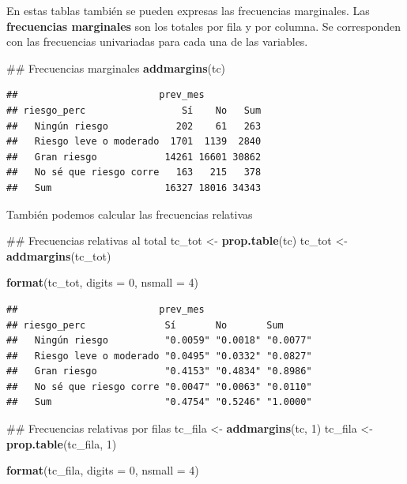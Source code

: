 \documentclass[spanish,]{book}
\newenvironment{Shaded}{\begin{snugshade}}{\end{snugshade}}
\newcommand{\KeywordTok}[1]{\textcolor[rgb]{0.13,0.29,0.53}{\textbf{#1}}}
\newcommand{\DataTypeTok}[1]{\textcolor[rgb]{0.13,0.29,0.53}{#1}}
\newcommand{\DecValTok}[1]{\textcolor[rgb]{0.00,0.00,0.81}{#1}}
\newcommand{\StringTok}[1]{\textcolor[rgb]{0.31,0.60,0.02}{#1}}
\newcommand{\NormalTok}[1]{#1}
\begin{document}
En estas tablas también se pueden expresas las frecuencias marginales.
Las \textbf{frecuencias marginales} son los totales por fila y por
columna. Se corresponden con las frecuencias univariadas para cada una
de las variables.

\begin{Shaded}
\begin{Highlighting}[]
\NormalTok{## Frecuencias marginales}
\KeywordTok{addmargins}\NormalTok{(tc)}
\end{Highlighting}
\end{Shaded}

\begin{verbatim}
##                         prev_mes
## riesgo_perc                 Sí    No   Sum
##   Ningún riesgo            202    61   263
##   Riesgo leve o moderado  1701  1139  2840
##   Gran riesgo            14261 16601 30862
##   No sé que riesgo corre   163   215   378
##   Sum                    16327 18016 34343
\end{verbatim}

También podemos calcular las frecuencias relativas

\begin{Shaded}
\begin{Highlighting}[]
\NormalTok{## Frecuencias relativas al total}
\NormalTok{tc_tot <-}\StringTok{ }\KeywordTok{prop.table}\NormalTok{(tc)}
\NormalTok{tc_tot <-}\StringTok{ }\KeywordTok{addmargins}\NormalTok{(tc_tot)}

\KeywordTok{format}\NormalTok{(tc_tot, }\DataTypeTok{digits =} \DecValTok{0}\NormalTok{, }\DataTypeTok{nsmall =} \DecValTok{4}\NormalTok{)}
\end{Highlighting}
\end{Shaded}

\begin{verbatim}
##                         prev_mes
## riesgo_perc              Sí       No       Sum     
##   Ningún riesgo          "0.0059" "0.0018" "0.0077"
##   Riesgo leve o moderado "0.0495" "0.0332" "0.0827"
##   Gran riesgo            "0.4153" "0.4834" "0.8986"
##   No sé que riesgo corre "0.0047" "0.0063" "0.0110"
##   Sum                    "0.4754" "0.5246" "1.0000"
\end{verbatim}

\begin{Shaded}
\begin{Highlighting}[]
\NormalTok{## Frecuencias relativas por filas}
\NormalTok{tc_fila <-}\StringTok{ }\KeywordTok{addmargins}\NormalTok{(tc, }\DecValTok{1}\NormalTok{)}
\NormalTok{tc_fila <-}\StringTok{ }\KeywordTok{prop.table}\NormalTok{(tc_fila, }\DecValTok{1}\NormalTok{)}

\KeywordTok{format}\NormalTok{(tc_fila, }\DataTypeTok{digits =} \DecValTok{0}\NormalTok{, }\DataTypeTok{nsmall =} \DecValTok{4}\NormalTok{)}
\end{Highlighting}
\end{Shaded}
\end{document}
